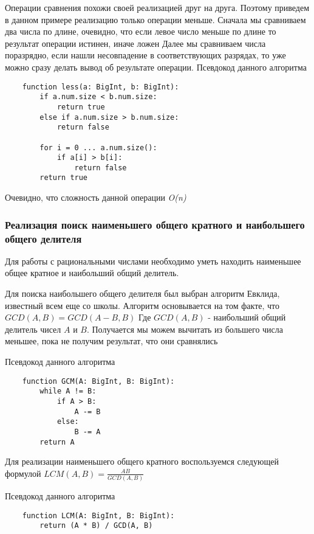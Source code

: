 \documentclass[a4paper,article,14pt]{extarticle}
\begin{document}
Операции сравнения похожи своей реализацией друг на друга. Поэтому приведем в 
данном примере реализацию только операции меньше. Сначала мы сравниваем два числа по длине,
очевидно, что если левое число меньше по длине то результат операции истинен, иначе ложен
Далее мы сравниваем числа поразрядно, если нашли несовпадение в соответствующих разрядах,
то уже можно сразу делать вывод об результате операции. Псевдокод данного алгоритма

\begin{lstlisting}
    function less(a: BigInt, b: BigInt):
        if a.num.size < b.num.size:
            return true
        else if a.num.size > b.num.size:
            return false

        for i = 0 ... a.num.size():
            if a[i] > b[i]:
                return false        
        return true
\end{lstlisting}

Очевидно, что сложность данной операции \emph{O(n)}

\subsubsection{Реализация поиск наименьшего общего кратного и наибольшего общего делителя}

Для работы с рациональными числами необходимо уметь находить наименьшее общее кратное
и наибольший общий делитель.

Для поиска наибольшего общего делителя был выбран алгоритм Евклида, известный всем еще со 
школы. Алгоритм основывается на том факте, что $ GCD(A, B) = GCD(A - B, B) $
Где $ GCD(A, B) $ - наибольший общий делитель чисел $A$ и $B$. Получается мы можем вычитать из большего числа меньшее, 
пока не получим результат, что они сравнялись

Псевдокод данного алгоритма

\begin{lstlisting}
    function GCM(A: BigInt, B: BigInt):
        while A != B:
            if A > B:
                A -= B
            else:
                B -= A
        return A
\end{lstlisting}


Для реализации наименьшего общего кратного воспользуемся следующей формулой $ LCM(A, B) = \frac{AB}{GCD(A, B)} $ 

Псевдокод данного алгоритма
\begin{lstlisting}
    function LCM(A: BigInt, B: BigInt):
        return (A * B) / GCD(A, B)
\end{lstlisting}
\end{document}
